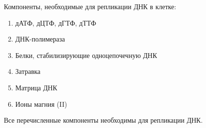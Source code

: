 
Компоненты, необходимые для репликации ДНК в клетке:

\begin{enumerate}
    \item дАТФ, дЦТФ, дГТФ, дТТФ
    \item ДНК-полимераза
    \item Белки, стабилизирующие одноцепочечную ДНК
    \item Затравка 
    \item Матрица ДНК 
    \item Ионы магния (II)
\end{enumerate}

\explanationSection

Все перечисленные компоненты необходимы для репликации ДНК.

